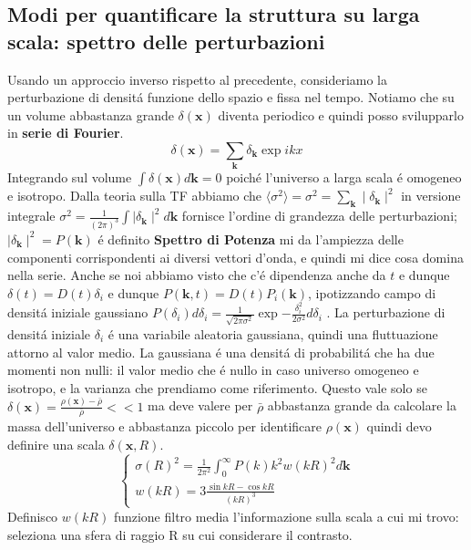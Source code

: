 \documentclass[12pt, a4paper]{article}
\begin{document}
\subsection{Modi per quantificare la struttura su larga scala: spettro delle perturbazioni}
Usando un approccio inverso rispetto al precedente, consideriamo la perturbazione di densit\'{a} funzione dello spazio e fissa nel tempo. Notiamo che su un volume abbastanza grande $\delta(\textbf{x})$ diventa periodico e quindi posso svilupparlo in \textbf{serie di Fourier}.
\begin{equation}
\delta(\textbf{x})=\sum_{\textbf{k}}\delta_{\textbf{k}}\exp{ikx}
\end{equation}
Integrando sul volume $\int \delta(\textbf{x})d\textbf{k}=0$ poich\'{e} l'universo a larga scala \'{e} omogeneo e isotropo. Dalla teoria sulla TF abbiamo che $\langle \sigma^2 \rangle =\sigma^2=\sum_{\textbf{k}} \mid \delta_{\textbf{k}}\mid^2$ in versione integrale $\sigma^2= \frac{1}{(2\pi)^3}\int \mid \delta_{\textbf{k}}\mid^2 d\textbf{k}$  fornisce l'ordine di grandezza delle perturbazioni; $\mid \delta_{\textbf{k}}\mid^2=P(\textbf{k})$ \'{e} definito \textbf{Spettro di Potenza} mi da l'ampiezza delle componenti corrispondenti ai diversi vettori d'onda, e quindi mi dice cosa domina nella serie. Anche se noi abbiamo visto che c'\'{e} dipendenza anche da $t$ e dunque $\delta(t)=D(t) \delta_i$ e dunque $P(\textbf{k},t)=D(t)P_i(\textbf{k})$, ipotizzando campo di densit\'{a} iniziale gaussiano $P(\delta_i) d\delta_i=\frac{1}{\sqrt{2\pi \sigma^2}}\exp{-\frac{\delta_i^2}{2\sigma^2}}d\delta_i$ . La perturbazione di densit\'{a} iniziale $\delta_i$ \'{e} una variabile aleatoria gaussiana, quindi una fluttuazione attorno al valor medio. La gaussiana \'{e} una densit\'{a} di probabilit\'{a} che ha due momenti non nulli: il valor medio che \'{e} nullo in caso universo omogeneo e isotropo, e la varianza che prendiamo come riferimento.  Questo vale solo se $\delta(\textbf{x})=\frac{\rho(\textbf{x})-\bar{\rho}}{\bar{\rho}}<<1$ ma deve valere per $\bar{\rho}$ abbastanza grande da calcolare la massa dell'universo e abbastanza piccolo per identificare $\rho(\textbf{x})$ quindi devo definire una scala $\delta (\textbf{x}, R)$. 
\begin{equation}
\begin{cases}
\sigma(R)^2= \frac{1}{2\pi^2}\int_0^{\infty} P(k) k^2 w(kR)^2 d\textbf{k}
\\
w(kR)=3\frac{\sin{kR}-\cos{kR}}{(kR)^3}
\end{cases}
\end{equation}
Definisco $w(kR)$ funzione filtro media l'informazione sulla scala a cui mi trovo: seleziona una sfera di raggio R su cui considerare il contrasto.
\end{document}
